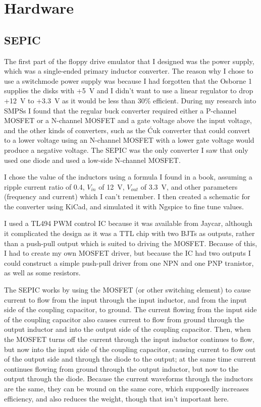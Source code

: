 \documentclass[a4paper]{article}
\begin{document}
\section{Hardware}

\subsection{SEPIC}

The first part of the floppy drive emulator that I designed was the
power supply, which was a single-ended primary inductor converter. The
reason why I chose to use a switchmode power supply was because I had
forgotten that the Osborne 1 supplies the disks with +5~V and I didn't
want to use a linear regulator to drop +12~V to +3.3~V as it would be
less than 30\% efficient. During my research into SMPSs I found that
the regular buck converter required either a P-channel MOSFET or a
N-channel MOSFET and a gate voltage above the input voltage, and the
other kinds of converters, such as the \'{C}uk converter that could
convert to a lower voltage using an N-channel MOSFET with a lower gate
voltage would produce a negative voltage. The SEPIC was the only
converter I saw that only used one diode and used a low-side N-channel
MOSFET.

I chose the value of the inductors using a formula I found in a book,
assuming a ripple current ratio of 0.4, \(V_{in}\) of \qty{12}{\V},
\(V_{out}\) of \qty{3.3}{\V}, and other parameters (frequency and
current) which I can't remember. I then created a schematic for the
converter using KiCad, and simulated it with Ngspice to fine tune
values.

I used a TL494 PWM control IC because it was available from Jaycar,
although it complicated the design as it was a TTL chip with two BJTs
as outputs, rather than a push-pull output which is suited to driving
the MOSFET. Because of this, I had to create my own MOSFET driver, but
because the IC had two outputs I could construct a simple push-pull
driver from one NPN and one PNP tranistor, as well as some resistors.

The SEPIC works by using the MOSFET (or other switching element) to
cause current to flow from the input through the input inductor, and
from the input side of the coupling capacitor, to ground. The current
flowing from the input side of the coupling capacitor also causes
current to flow from ground through the output inductor and into the
output side of the coupling capacitor. Then, when the MOSFET turns off
the current through the input inductor continues to flow, but now into
the input side of the coupling capacitor, causing current to flow out
of the output side and through the diode to the output; at the same
time current continues flowing from ground through the output
inductor, but now to the output through the diode. Because the current
waveforms through the inductors are the same, they can be wound on the
same core, which supposedly increases efficiency, and also reduces the
weight, though that isn't important here.
\end{document}
